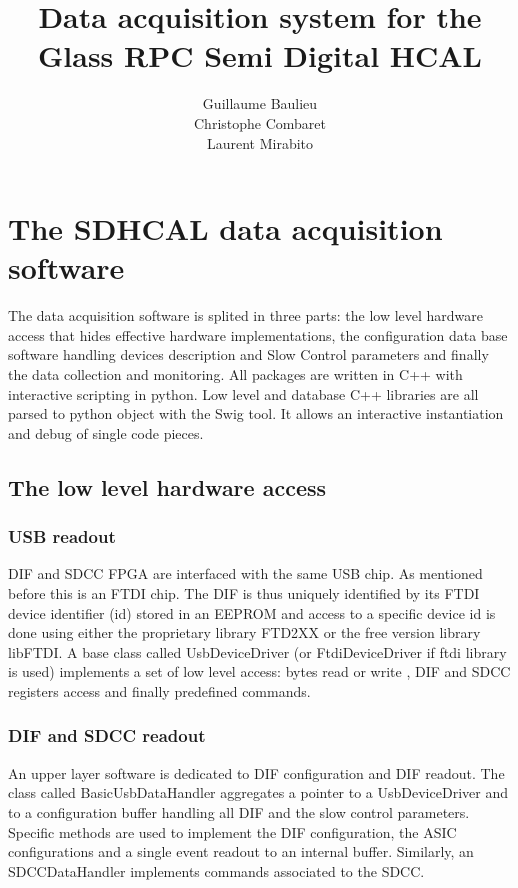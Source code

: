 \documentclass[english]{article}
\title{\textbf{Data acquisition system for the Glass RPC Semi Digital HCAL}}
\author{Guillaume Baulieu\\
		Christophe Combaret\\
		Laurent Mirabito \\
		}
\date{}
\begin{document}
\maketitle
\section{The SDHCAL data acquisition software}
The data acquisition software is splited in three parts: the low
level hardware access that hides  effective hardware implementations,
the configuration data base software handling devices description
and Slow Control parameters and finally the data collection and monitoring. All
packages are written in C++ with interactive scripting in python.
Low level and database C++ libraries are all parsed to python object
with the Swig tool. It allows an interactive instantiation and debug
of single code pieces.


\subsection{The low level hardware access}


\subsubsection{USB readout}

DIF and SDCC FPGA are interfaced with the same USB chip. As mentioned before this is  an
FTDI chip. The DIF is thus uniquely identified by its FTDI device identifier (id) stored in an EEPROM and access to
a specific device id is done using either the proprietary library
FTD2XX or the free version library libFTDI. A base class called  UsbDeviceDriver (or FtdiDeviceDriver if ftdi library is used) implements
a set of low level access: bytes read or write , DIF  and SDCC registers
access and finally predefined commands.


\subsubsection{DIF and SDCC readout}

An upper layer software is dedicated to DIF configuration and
DIF readout. The class called BasicUsbDataHandler aggregates a pointer to
a UsbDeviceDriver and to a configuration buffer handling all DIF and
the slow control parameters. Specific methods are used to implement the DIF configuration,
the ASIC configurations and a single event readout to an internal
buffer. Similarly, an SDCCDataHandler implements commands associated to the SDCC.
\end{document}
